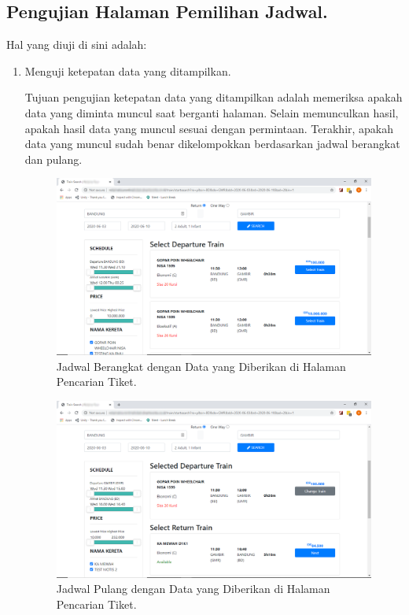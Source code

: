 \subsection{Pengujian Halaman Pemilihan Jadwal.}
\label{subsec:pengujianpilihjadwal}

Hal yang diuji di sini adalah:
    \begin{enumerate}
        \item Menguji ketepatan data yang ditampilkan.
        
        Tujuan pengujian ketepatan data yang ditampilkan adalah memeriksa apakah data yang diminta muncul saat berganti halaman. Selain memunculkan hasil, apakah hasil data yang muncul sesuai dengan permintaan. Terakhir, apakah data yang muncul sudah benar dikelompokkan berdasarkan jadwal berangkat dan pulang.
        
        \begin{figure}[H]
        \center
        \includegraphics[width=\textwidth,height=\textheight,keepaspectratio]{Gambar/Search result pilih jadwal berangkat.png}
        \caption{Jadwal Berangkat dengan Data yang Diberikan di Halaman Pencarian Tiket.}
            \label{img:searchresultberangkat}
        \end{figure}
        
        \begin{figure}[H]
        \center
        \includegraphics[width=\textwidth,height=\textheight,keepaspectratio]{Gambar/Search result pilih jadwal pulang.png}
        \caption{Jadwal Pulang dengan Data yang Diberikan di Halaman Pencarian Tiket.}
            \label{img:searchresultpulang}
        \end{figure}
        

\end{enumerate}
